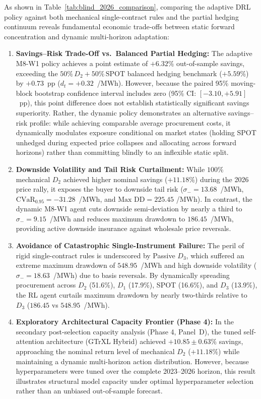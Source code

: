 As shown in Table~\ref{tab:blind_2026_comparison}, comparing the adaptive DRL policy against both mechanical single-contract rules and the partial hedging continuum reveals fundamental economic trade-offs between static forward concentration and dynamic multi-horizon adaptation:
\begin{enumerate}
    \item \textbf{Savings--Risk Trade-Off vs.\ Balanced Partial Hedging:} The adaptive M8-W1 policy achieves a point estimate of $+6.32\%$ out-of-sample savings, exceeding the $50\%\, D_2 + 50\%\, \text{SPOT}$ balanced hedging benchmark ($+5.59\%$) by $+0.73$~pp ($d_t = +0.32$~\texteuro/MWh). However, because the paired 95\% moving-block bootstrap confidence interval includes zero (95\% CI: $[-3.10, +5.91]$~pp), this point difference does not establish statistically significant savings superiority. Rather, the dynamic policy demonstrates an alternative savings--risk profile: while achieving comparable average procurement costs, it dynamically modulates exposure conditional on market states (holding SPOT unhedged during expected price collapses and allocating across forward horizons) rather than committing blindly to an inflexible static split.
    \item \textbf{Downside Volatility and Tail Risk Curtailment:} While $100\%$ mechanical $D_2$ achieved higher nominal savings ($+11.18\%$) during the 2026 price rally, it exposes the buyer to downside tail risk ($\sigma_- = 13.68$~\texteuro/MWh, $\text{CVaR}_{0.95} = -31.28$~\texteuro/MWh, and $\text{Max DD} = 225.45$ \texteuro/MWh). In contrast, the dynamic M8-W1 agent cuts downside semi-deviation by nearly a third to $\sigma_- = 9.15$~\texteuro/MWh and reduces maximum drawdown to $186.45$~\texteuro/MWh, providing active downside insurance against wholesale price reversals.
    \item \textbf{Avoidance of Catastrophic Single-Instrument Failure:} The peril of rigid single-contract rules is underscored by Passive $D_3$, which suffered an extreme maximum drawdown of $548.95$~\texteuro/MWh and high downside volatility ($\sigma_- = 18.63$~\texteuro/MWh) due to basis reversals. By dynamically spreading procurement across $D_2$ (51.6\%), $D_1$ (17.9\%), SPOT (16.6\%), and $D_3$ (13.9\%), the RL agent curtails maximum drawdown by nearly two-thirds relative to $D_3$ ($186.45$ vs $548.95$~\texteuro/MWh).
    \item \textbf{Exploratory Architectural Capacity Frontier (Phase 4):} In the secondary post-selection capacity analysis (Phase 4, Panel~D), the tuned self-attention architecture (GTrXL Hybrid) achieved $+10.85 \pm 0.63\%$ savings, approaching the nominal return level of mechanical $D_2$ ($+11.18\%$) while maintaining a dynamic multi-horizon action distribution. However, because hyperparameters were tuned over the complete 2023--2026 horizon, this result illustrates structural model capacity under optimal hyperparameter selection rather than an unbiased out-of-sample forecast.
\end{enumerate}
